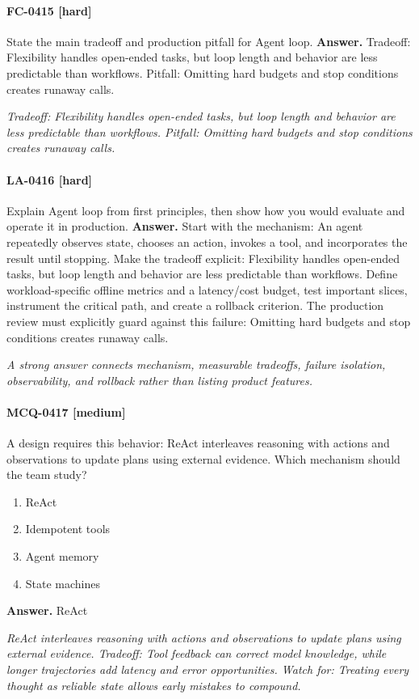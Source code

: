 \paragraph{FC-0415 [hard]} State the main tradeoff and production pitfall for Agent loop.
\noindent\textbf{Answer.} Tradeoff: Flexibility handles open-ended tasks, but loop length and behavior are less predictable than workflows. Pitfall: Omitting hard budgets and stop conditions creates runaway calls.
\par\textit{Tradeoff: Flexibility handles open-ended tasks, but loop length and behavior are less predictable than workflows. Pitfall: Omitting hard budgets and stop conditions creates runaway calls.}
\paragraph{LA-0416 [hard]} Explain Agent loop from first principles, then show how you would evaluate and operate it in production.
\noindent\textbf{Answer.} Start with the mechanism: An agent repeatedly observes state, chooses an action, invokes a tool, and incorporates the result until stopping. Make the tradeoff explicit: Flexibility handles open-ended tasks, but loop length and behavior are less predictable than workflows. Define workload-specific offline metrics and a latency/cost budget, test important slices, instrument the critical path, and create a rollback criterion. The production review must explicitly guard against this failure: Omitting hard budgets and stop conditions creates runaway calls.
\par\textit{A strong answer connects mechanism, measurable tradeoffs, failure isolation, observability, and rollback rather than listing product features.}
\paragraph{MCQ-0417 [medium]} A design requires this behavior: ReAct interleaves reasoning with actions and observations to update plans using external evidence. Which mechanism should the team study?
\begin{enumerate}[label=\Alph*.]
\item ReAct
\item Idempotent tools
\item Agent memory
\item State machines
\end{enumerate}
\noindent\textbf{Answer.} ReAct
\par\textit{ReAct interleaves reasoning with actions and observations to update plans using external evidence. Tradeoff: Tool feedback can correct model knowledge, while longer trajectories add latency and error opportunities. Watch for: Treating every thought as reliable state allows early mistakes to compound.}
